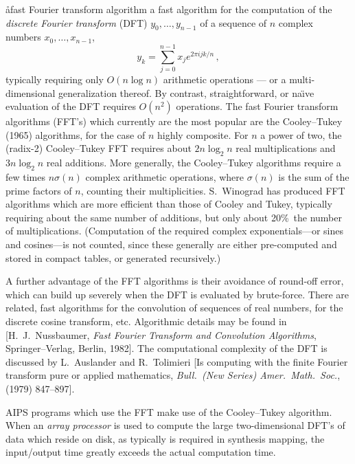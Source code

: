 \aa{fast Fourier transform algorithm}
a fast algorithm for the computation of the {\it discrete Fourier transform}
(DFT) $y_0,\dots,y_{n-1}$ of a sequence
of $n$ complex numbers $x_0,\dots,x_{n-1}$,
$$y_k=\sum_{j=0}^{n-1}x_j e^{2\pi ijk/n}\,,$$
typically requiring only $O(n\log n)$ arithmetic operations ---
or a multi-dimensional generalization thereof.
By contrast, straightforward, or na\"\i ve evaluation of the DFT
requires $O(n^2)$ operations.
The fast Fourier transform algorithms (FFT's) which currently are the
most popular are the Cooley--Tukey (1965) algorithms, for the case of
$n$ highly composite.
For $n$ a power of two, the (radix-2) Cooley--Tukey FFT requires
about $2n\log_2n$ real multiplications and $3n\log_2n$ real additions.
More generally, the Cooley--Tukey algorithms require
a few times $n\sigma(n)$ complex arithmetic operations,
where $\sigma(n)$ is the sum of the prime factors of $n$,
counting their multiplicities.
S.~Winograd has produced FFT algorithms which are more efficient than
those of Cooley and Tukey, typically requiring about the same number
of additions, but only about 20\%\ the number of multiplications.
(Computation of the required complex exponentials---or sines and
cosines---is not counted, since these generally are either pre-computed and
stored in compact tables, or generated recursively.)
\par
A further advantage of the FFT algorithms is their avoidance of
round-off error, which can build up severely when the DFT is
evaluated by brute-force.
There are related, fast algorithms for the convolution of sequences of
real numbers, for the discrete cosine transform, etc.
Algorithmic details may be found in [H.~J.~Nussbaumer,
{\it Fast Fourier Transform and Convolution Algorithms}, Springer--Verlag,
Berlin, 1982].
The computational complexity of the DFT is discussed by
L.~Auslander and R.~Tolimieri [Is computing with the finite
Fourier transform pure or applied mathematics, {\it Bull.\ (New Series)
Amer.\ Math.\ Soc.},  (1979) 847--897].
\par
AIPS programs which use the FFT make use of the Cooley--Tukey algorithm.
When an {\it array processor} is used to compute the large two-dimensional
DFT's of data which reside on disk, as typically is required in
synthesis mapping,
the input\slash output time greatly exceeds the actual computation time.

